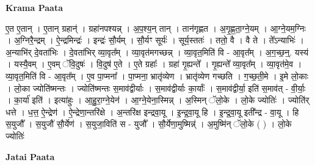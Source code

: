 \documentclass[17pt]{extarticle}
\begin{document}
\textbf{Krama Paata} \newline

ए॒त ए॒तान् । ए॒तान् ग्रहान्॑ । ग्रहा॑नपश्यन्न् । अ॒प॒श्य॒न् तान् । तान॑गृह्णत । अ॒गृ॒ह्ण॒ता॒ग्ने॒यम् । आ॒ग्ने॒यम॒ग्निः । अ॒ग्निरै॒न्द्रम् । ऐ॒न्द्रमिन्द्रः॑ । इन्द्रः॑ सौ॒र्यम् । सौ॒र्यꣳ सूर्यः॑ । सूर्य॒स्ततः॑ । ततो॒ वै । वै ते । ते᳚ऽन्याभिः॑ । अ॒न्याभि॑र् दे॒वता॑भिः । दे॒वता॑भिर् व्या॒वृत᳚म् । व्या॒वृत॑मगच्छन्न् । व्या॒वृत॒मिति॑ वि - आ॒वृत᳚म् । अ॒ग॒च्छ॒न्॒. यस्य॑ । यस्यै॒वम् । ए॒वम् ॅवि॒दुषः॑ । वि॒दुष॑ ए॒ते । ए॒ते ग्रहाः᳚ । ग्रहा॑ गृ॒ह्यन्ते᳚ । गृ॒ह्यन्ते᳚ व्या॒वृत᳚म् । व्या॒वृत॑मे॒व । व्या॒वृत॒मिति॑ वि - आ॒वृत᳚म् । ए॒व पा॒प्मना᳚ । पा॒प्मना॒ भ्रातृ॑व्येण । भ्रातृ॑व्येण गच्छति । ग॒च्छ॒ती॒मे । इ॒मे लो॒काः । लो॒का ज्योति॑ष्मन्तः । ज्योति॑ष्मन्तः स॒माव॑द्वीर्याः । स॒माव॑द्वीर्याः का॒र्याः᳚ । स॒माव॑द्वीर्या॒ इति॑ स॒माव॑त् - वी॒र्याः॒ । का॒र्या॑ इति॑ । इत्या॑हुः । आ॒हु॒रा॒ग्ने॒येन॑ । आ॒ग्ने॒येना॒स्मिन्न् । अ॒स्मिन् ॅलो॒के । लो॒के ज्योतिः॑ । ज्योति॑र् धत्ते । ध॒त्त॒ ऐ॒न्द्रेण॑ । ऐ॒न्द्रेणा॒न्तरि॑क्षे । अ॒न्तरि॑क्ष इन्द्रवा॒यू । इ॒न्द्र॒वा॒यू हि । इ॒न्द्र॒वा॒यू इती᳚न्द्र - वा॒यू । हि स॒युजौ᳚ । स॒युजौ॑ सौ॒र्येण॑ । स॒युजा॒विति॑ स - युजौ᳚ । सौ॒र्येणा॒मुष्मिन्न्॑ । अ॒मुष्मि॑न् ॅलो॒के ( ) । लो॒के ज्योतिः॑ \newline

\textbf{Jatai Paata} \newline
\end{document}
